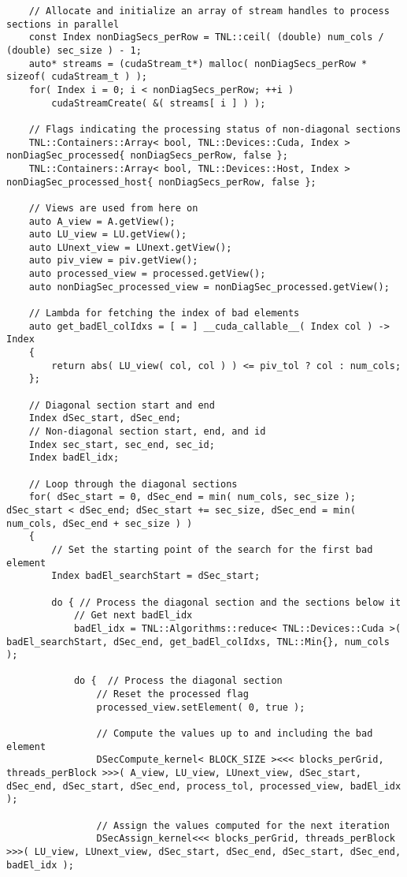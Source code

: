\begin{lstlisting}
	// Allocate and initialize an array of stream handles to process sections in parallel
	const Index nonDiagSecs_perRow = TNL::ceil( (double) num_cols / (double) sec_size ) - 1;
	auto* streams = (cudaStream_t*) malloc( nonDiagSecs_perRow * sizeof( cudaStream_t ) );
	for( Index i = 0; i < nonDiagSecs_perRow; ++i )
		cudaStreamCreate( &( streams[ i ] ) );
	
	// Flags indicating the processing status of non-diagonal sections
	TNL::Containers::Array< bool, TNL::Devices::Cuda, Index > nonDiagSec_processed{ nonDiagSecs_perRow, false };
	TNL::Containers::Array< bool, TNL::Devices::Host, Index > nonDiagSec_processed_host{ nonDiagSecs_perRow, false };
	
	// Views are used from here on
	auto A_view = A.getView();
	auto LU_view = LU.getView();
	auto LUnext_view = LUnext.getView();
	auto piv_view = piv.getView();
	auto processed_view = processed.getView();
	auto nonDiagSec_processed_view = nonDiagSec_processed.getView();
	
	// Lambda for fetching the index of bad elements
	auto get_badEl_colIdxs = [ = ] __cuda_callable__( Index col ) -> Index
	{
		return abs( LU_view( col, col ) ) <= piv_tol ? col : num_cols;
	};
	
	// Diagonal section start and end
	Index dSec_start, dSec_end;
	// Non-diagonal section start, end, and id
	Index sec_start, sec_end, sec_id;
	Index badEl_idx;
	
	// Loop through the diagonal sections
	for( dSec_start = 0, dSec_end = min( num_cols, sec_size ); dSec_start < dSec_end; dSec_start += sec_size, dSec_end = min( num_cols, dSec_end + sec_size ) )
	{
		// Set the starting point of the search for the first bad element
		Index badEl_searchStart = dSec_start;
		
		do { // Process the diagonal section and the sections below it
			// Get next badEl_idx
			badEl_idx = TNL::Algorithms::reduce< TNL::Devices::Cuda >( badEl_searchStart, dSec_end, get_badEl_colIdxs, TNL::Min{}, num_cols );
			
			do {  // Process the diagonal section
				// Reset the processed flag
				processed_view.setElement( 0, true );
				
				// Compute the values up to and including the bad element
				DSecCompute_kernel< BLOCK_SIZE ><<< blocks_perGrid, threads_perBlock >>>( A_view, LU_view, LUnext_view, dSec_start, dSec_end, dSec_start, dSec_end, process_tol, processed_view, badEl_idx );
				
				// Assign the values computed for the next iteration
				DSecAssign_kernel<<< blocks_perGrid, threads_perBlock >>>( LU_view, LUnext_view, dSec_start, dSec_end, dSec_start, dSec_end, badEl_idx );
				

\end{lstlisting}
